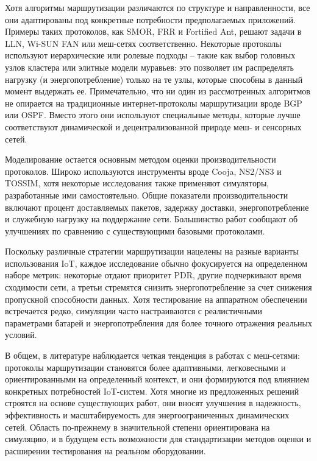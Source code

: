 \documentclass[%
]{report}
\begin{document}
Хотя алгоритмы маршрутизации различаются по
структуре и направленности, все они адаптированы
под конкретные потребности предполагаемых приложений.
Примеры таких протоколов, как SMOR, FRR и Fortified Ant,
решают задачи в LLN, Wi-SUN FAN или меш-сетях
соответственно. Некоторые протоколы используют
иерархические или ролевые подходы --
такие как выбор головных узлов кластера или
элитные модели муравьев: это позволяет им
распределять нагрузку (и энергопотребление)
только на те узлы, которые способны в данный момент
выдержать ее.
Примечательно, что ни один из рассмотренных алгоритмов
не опирается на традиционные интернет-протоколы маршрутизации
вроде BGP или OSPF. Вместо этого они
используют специальные методы, которые лучше соответствуют
динамической и децентрализованной природе меш- и сенсорных сетей.

Моделирование остается основным методом оценки
производительности протоколов. Широко используются инструменты вроде Cooja, NS2/NS3 и TOSSIM,
хотя некоторые исследования также применяют
симуляторы, разработанные ими самостоятельно. Общие показатели
производительности включают процент доставляемых пакетов, задержку доставки,
энергопотребление и служебную нагрузку на поддержание сети.
Большинство работ сообщают об улучшениях по сравнению
с существующими базовыми протоколами.

Поскольку различные стратегии маршрутизации
нацелены на разные варианты использования IoT,
каждое исследование обычно фокусируется
на определенном наборе метрик: некоторые
отдают приоритет PDR, другие подчеркивают
время сходимости сети, а третьи
стремятся снизить энергопотребление за
счет снижения пропускной способности данных.
Хотя тестирование на аппаратном
обеспечении встречается редко, симуляции
часто настраиваются с реалистичными параметрами
батарей и энергопотребления для более точного
отражения реальных условий.

В общем, в литературе наблюдается четкая
тенденция в работах с  меш-сетями:
протоколы маршрутизации становятся более адаптивными,
легковесными и ориентированными на определенный контекст,
и они формируются под влиянием конкретных
потребностей IoT-систем. Хотя многие
из предложенных решений строятся на
основе существующих работ,
они вносят улучшения в надежность,
эффективность и масштабируемость для энергоограниченных
динамических сетей. Область по-прежнему в
значительной степени ориентирована на симуляцию,
и в будущем есть возможности
для стандартизации методов оценки и расширении
тестирования на реальном оборудовании.
\end{document}

